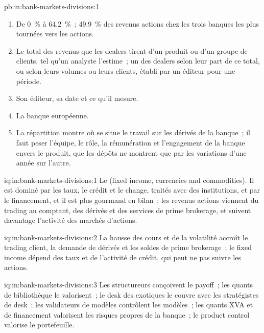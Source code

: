 \begin{solution}{pb:in:bank-markets-divisions:1}
\begin{enumerate}
\item De 0~\% à 64.2~\%~; 49.9~\% des revenus actions chez les trois banques les plus tournées vers les actions.
\item Le total des revenus que les dealers tirent d'un produit ou d'un groupe de clients, tel qu'un analyste l'estime~; un  des dealers
selon leur part de ce total, ou selon leurs volumes ou leurs clients, établi par un éditeur pour une période.
\item Son éditeur, sa date et ce qu'il mesure.
\item La banque européenne.
\item La répartition montre où se situe le travail sur les dérivés de la banque~; il faut peser l'équipe, le rôle, la rémunération et l'engagement de la banque envers
le produit, que les dépôts ne montrent que par les variations d'une année sur l'autre.
\end{enumerate}
\end{solution}

\begin{solution}{iq:in:bank-markets-divisions:1}
Le  (fixed income, currencies and commodities). Il est dominé par les taux, le crédit et le change, traités avec des institutions, et par le financement,
et il est plus gourmand en bilan~; les revenus actions viennent du trading au comptant, des dérivés et des services de prime
brokerage, et suivent davantage l'activité des marchés d'actions.
\end{solution}

\begin{solution}{iq:in:bank-markets-divisions:2}
La hausse des cours et de la volatilité accroît le trading client, la demande de dérivés et les soldes de prime brokerage~; le fixed income dépend des taux
et de l'activité de crédit, qui peut ne pas suivre les actions.
\end{solution}

\begin{solution}{iq:in:bank-markets-divisions:3}
Les structureurs conçoivent le payoff~; les quants de bibliothèque le valorisent~; le desk des exotiques le couvre avec les stratégistes de
desk~; les validateurs de modèles contrôlent les modèles~; les quants XVA et de financement valorisent les risques propres de la banque~; le product control valorise le portefeuille.
\end{solution}

